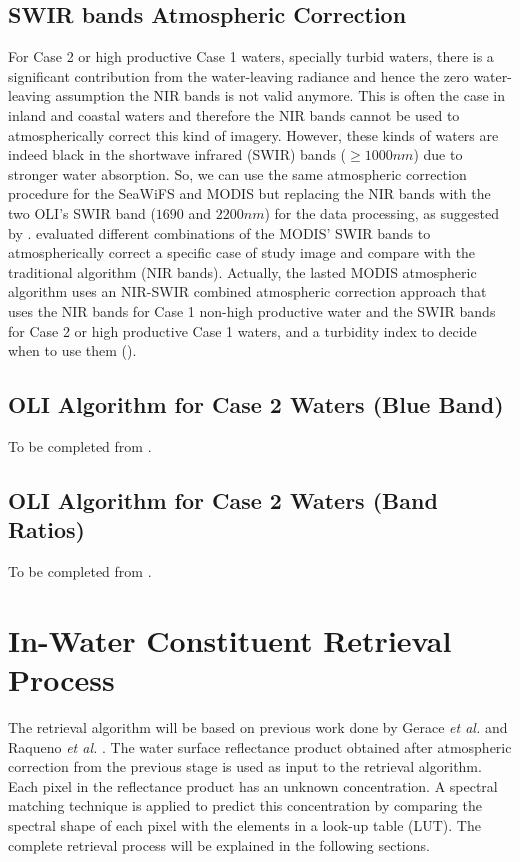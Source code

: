 \subsection{SWIR bands Atmospheric Correction}

For Case 2 or high productive Case 1 waters, specially turbid waters, there is a significant contribution from the water-leaving radiance and hence the zero water-leaving assumption the NIR bands is not valid anymore. This is often the case in inland and coastal waters and therefore the NIR bands cannot be used to atmospherically correct this kind of imagery. However, these kinds of waters are indeed black in the shortwave infrared (SWIR) bands ($\geq 1000nm$) due to stronger water absorption. So, we can use the same atmospheric correction procedure for the SeaWiFS and MODIS but replacing the NIR bands with the two OLI's SWIR band ($1690$ and $2200nm$) for the data processing, as suggested by \cite{Wang:2007,Wang:2005}. \cite{Wang:2007} evaluated different combinations of the MODIS' SWIR bands to atmospherically correct a specific case of study image and compare with the traditional algorithm (NIR bands). Actually, the lasted MODIS atmospheric algorithm uses an NIR-SWIR combined atmospheric correction approach that uses the NIR bands for Case 1 non-high productive water and the SWIR bands for Case 2 or high productive Case 1 waters, and a turbidity index to decide when to use them (\cite{Wang:2007dz}). 

\subsection{OLI Algorithm for Case 2 Waters (Blue Band)}
To be completed from \cite{GeraceThesis}.
\subsection{OLI Algorithm for Case 2 Waters (Band Ratios)}
To be completed from \cite{GeraceThesis}.

\section{In-Water Constituent Retrieval Process}
\label{sec:retrieval}
The retrieval algorithm will be based on previous work done by Gerace {\it et al.} \cite{Gerace:2013} and Raqueno {\it et al.} \cite{Raqueno:2000}. The water surface reflectance product obtained after atmospheric correction from the previous stage is used as input to the retrieval algorithm. Each pixel in the reflectance product has an unknown concentration. A spectral matching technique is applied to predict this concentration by comparing the spectral shape of each pixel with the elements in a look-up table (LUT). The complete retrieval process will be explained in the following sections.

